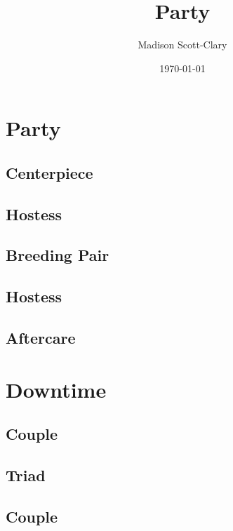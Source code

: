 \documentclass[12pt,letterpaper,oneside]{memoir}
\title{Party}
\author{Madison Scott-Clary}
\date{\today}
\begin{document}
  \frontmatter
  \maketitle

  \newpage
  \tableofcontents*

  \mainmatter

  \chapter{Party}

  \section{Centerpiece}
  

  \section{Hostess}
  

  \section{Breeding Pair}
  

  \section{Hostess}
  

  \section{Aftercare}
  

  \chapter{Downtime}

  \section{Couple}
  

  \section{Triad}
  

  \section{Couple}
  
\end{document}
